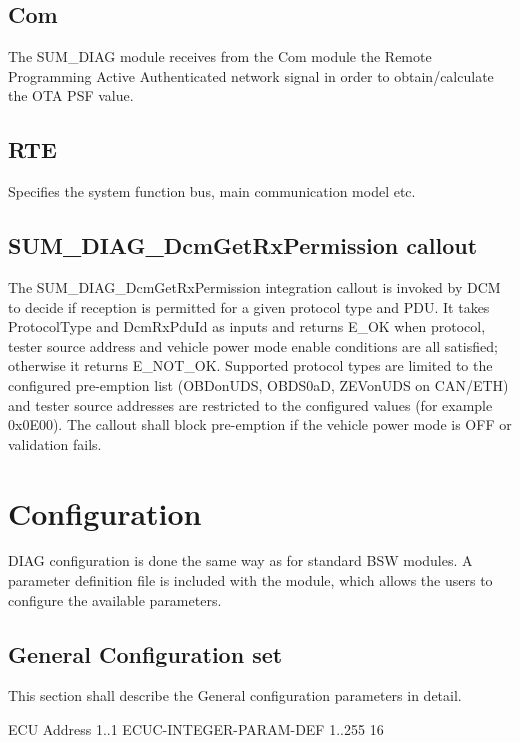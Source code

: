 \subsection{Com}
The SUM_DIAG module receives from the Com module the Remote Programming Active Authenticated network signal in order to obtain/calculate the OTA PSF value.

\subsection{RTE}

Specifies the system function bus, main communication model etc.

\subsection{SUM\_DIAG\_DcmGetRxPermission callout}

{
The SUM\_DIAG\_DcmGetRxPermission integration callout is invoked by DCM to decide if reception is permitted for a given protocol type and PDU. It takes ProtocolType and DcmRxPduId as inputs and returns E\_OK when protocol, tester source address and vehicle power mode enable conditions are all satisfied; otherwise it returns E\_NOT\_OK. Supported protocol types are limited to the configured pre-emption list (OBDonUDS, OBDS0aD, ZEVonUDS on CAN/ETH) and tester source addresses are restricted to the configured values (for example 0x0E00). The callout shall block pre-emption if the vehicle power mode is OFF or validation fails. 
}
{ }

\section{Configuration}

DIAG configuration is done the same way as for standard BSW modules. A parameter definition file is included with the module, which allows the users to configure the available parameters.

\subsection{General Configuration set}
\label{sec:General_Configuration_set}
This section shall describe the General configuration parameters in detail.

{ECU Address}
{1..1}
{ECUC-INTEGER-PARAM-DEF}
{1..255}
{16}

